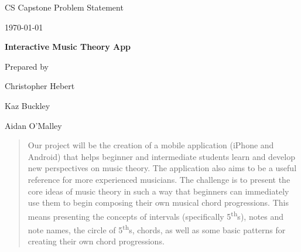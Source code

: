 \documentclass[onecolumn, draftclsnofoot,10pt, compsoc]{IEEEtran}
\def \GroupMemberOne{			Christopher Hebert}
\def \GroupMemberTwo{			Kaz Buckley}
\def \GroupMemberThree{			Aidan O'Malley}
\def \CapstoneProjectName{		Interactive Music Theory App}
\def \CapstoneSponsorPerson{		Lukas Hein}
\def \DocType{		Problem Statement
                    }
\newcommand{\NameSigPair}[1]{\par
    \makebox[2.75in][r]{#1} \hfil 	\makebox[3.25in]{\makebox[2.25in]{\hrulefill} \hfill		\makebox[.75in]{\hrulefill}}
    \par\vspace{-12pt} \textit{\tiny\noindent
    \makebox[2.75in]{} \hfil		\makebox[3.25in]{\makebox[2.25in][r]{Signature} \hfill	\makebox[.75in][r]{Date}}}}
\begin{document}
    \begin{titlepage}
        \begin{singlespace}
            \hfill 
            \par\vspace{.2in}
            \centering
            \scshape{
                \huge CS Capstone \DocType \par
                {\large\today}\par
                \vspace{.5in}
                \textbf{\Huge\CapstoneProjectName}\par
                \vfill
                \vspace{2pt}
                {\large Prepared by }\par
                \GroupMemberOne\par
                \GroupMemberTwo\par
                \GroupMemberThree\par
                \vspace{5pt}
                \vspace{20pt}
            }
            \begin{abstract}
              Our project will be the creation of a mobile application (iPhone and Android) that helps beginner and intermediate students learn and develop new perspectives on music theory. The application also aims to be a useful reference for more experienced musicians.
              The challenge is to present the core ideas of music theory in such a way that beginners can immediately use them to begin composing their own musical chord progressions. 
              This means presenting the concepts of intervals (specifically 5\textsuperscript{th}s), notes and note names, the circle of 5\textsuperscript{th}s, chords, as well as some basic patterns for creating their own chord progressions.
              

\end{abstract}
\end{singlespace}
\end{titlepage}
\end{document}
